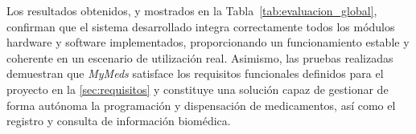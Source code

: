 Los resultados obtenidos, y mostrados en la Tabla~\ref{tab:evaluacion_global}, confirman que el sistema desarrollado integra correctamente todos los módulos hardware y software implementados, proporcionando un funcionamiento estable y coherente en un escenario de utilización real. Asimismo, las pruebas realizadas demuestran que \textit{MyMeds} satisface los requisitos funcionales definidos para el proyecto en la \autoref{sec:requisitos} y constituye una solución capaz de gestionar de forma autónoma la programación y dispensación de medicamentos, así como el registro y consulta de información biomédica.


